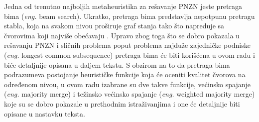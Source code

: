 \documentclass[12pt,oneside]{memoir}
\begin{document}
Jedna od trenutno najboljih metaheuristika za rešavanje PNZN jeste pretraga bima (\textit{eng.} beam search). Ukratko, pretraga
bima predstavlja nepotpunu pretragu stabla, koja na svakom nivou proširuje graf stanja tako što napreduje sa čvorovima koji najviše
obećavaju \cite{SCSBS}. Upravo zbog toga što se dobro pokazala u rešavanju PNZN i sličnih problema poput problema najduže zajedničke podniske
(\textit{eng.} longest common subsequence) pretraga bima će biti korišćena u ovom radu i biće detaljnije opisana u daljem tekstu.
S obzirom na to da pretraga bima podrazumeva postojanje heurističke funkcije koja će oceniti kvalitet čvorova na određenom nivou,
u ovom radu izabrane su dve takve funkcije, većinsko spajanje (\textit{eng.} majority merge) i težinsko većinsko spajanje
(\textit{eng.} weighted majority merge) koje su se dobro pokazale u prethodnim istraživanjima i one će detaljnije biti 
opisane u nastavku teksta.




\end{document}
